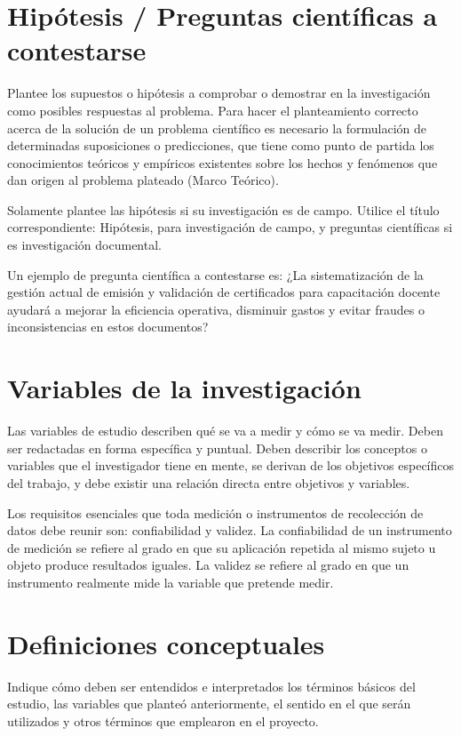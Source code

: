 \documentclass[12pt, a4paper, nofontenc, numbers=endperiod]{apa7}
\begin{document}
{\section{\normalsize  \centering Hipótesis / Preguntas científicas a contestarse}	
	
	\setlength{\parindent}{1.27cm} Plantee los supuestos o hipótesis a comprobar o demostrar en la investigación como posibles respuestas al problema. Para hacer el planteamiento correcto acerca de la solución de un problema científico es necesario la formulación de determinadas suposiciones o predicciones, que tiene como punto de partida los conocimientos teóricos y empíricos existentes sobre los hechos y fenómenos que dan origen al problema plateado (Marco Teórico).
	
	\setlength{\parindent}{1.27cm} Solamente plantee las hipótesis si su investigación es de campo. Utilice el título correspondiente: Hipótesis, para investigación de campo, y preguntas científicas si es investigación documental.

	\setlength{\parindent}{1.27cm}  Un ejemplo de pregunta científica a contestarse es: ¿La sistematización de la gestión actual de emisión y validación de certificados para capacitación docente ayudará a mejorar la eficiencia operativa, disminuir gastos y evitar fraudes o inconsistencias en estos documentos?

\section{\normalsize  \centering Variables de la investigación}	
	
	\setlength{\parindent}{1.27cm} Las variables de estudio describen qué se va a medir y cómo se va medir. Deben ser redactadas en forma específica y puntual. Deben describir los conceptos o variables que el investigador tiene en mente, se derivan de los objetivos específicos del trabajo, y debe existir una relación directa entre objetivos y variables.
	
	\setlength{\parindent}{1.27cm} Los requisitos esenciales que toda medición o instrumentos de recolección de datos debe reunir son: confiabilidad y validez. La confiabilidad de un instrumento de medición se refiere al grado en que su aplicación repetida al mismo sujeto u objeto produce resultados iguales. La validez se refiere al grado en que un instrumento realmente mide la variable que pretende medir.
	
\section{\normalsize  \centering Definiciones conceptuales}	
	
	Indique cómo deben ser entendidos e interpretados los términos básicos del estudio, las variables que planteó anteriormente, el sentido en el que serán utilizados y otros términos que emplearon en el proyecto.
	
	\newpage}	
		
\end{document}
